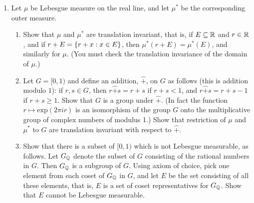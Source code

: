 \begin{enumerate}[label=\arabic*),ref=\arabic*]
\item \label{exer:lebesgue measure rotation inv}
Let $\mu$ be Lebesgue measure on the real line, and let $\mu^*$ be the corresponding outer measure.
\begin{enumerate}[label=\alph*),ref=\theenumi\alph*)]
\item \label{exer:item:translation inv}
Show that $\mu$ and $\mu^*$ are translation invariant, that is, if $E\subseteq\mathbb{R}$ and $r\in\mathbb{R}$, and if $r+E=\left\{r+x:x\in E\right\}$, then $\mu^*(r+E)=\mu^*(E)$, and similarly for $\mu$. (You must check the translation invariance of the domain of $\mu$.)
\item Let $G=[0,1)$ and define an addition, $\widehat{+}$, on $G$ as follows (this is addition modulo $1$): if $r,s\in G$, then $r\widehat{+}s=r+s$ if $r+s<1$, and $r\widehat{+}s=r+s-1$ if $r+s\geq1$. Show that $G$ is a group under $\widehat{+}$. (In fact the function $r\mapsto\text{exp}(2\pi ir)$ is an isomorphism of the group $G$ onto the multiplicative group of complex numbers of modulus 1.) Show that restriction of $\mu$ and $\mu^*$ to $G$ are translation invariant with respect to $\widehat{+}$.
\item Show that there is a subset of $[0,1)$ which is not Lebesgue measurable, as follows. Let $G_{\mathbb{Q}}$ denote the subset of $G$ consisting of the rational numbers in $G$. Then $G_{\mathbb{Q}}$ is a subgroup of $G$. Using axiom of choice, pick one element from each coset of $G_{\mathbb{Q}}$ in $G$, and let $E$ be the set consisting of all these elements, that is, $E$ is a set of coset representatives for $G_{\mathbb{Q}}$. Show that $E$ cannot be Lebesgue measurable.
\end{enumerate}

\end{enumerate}